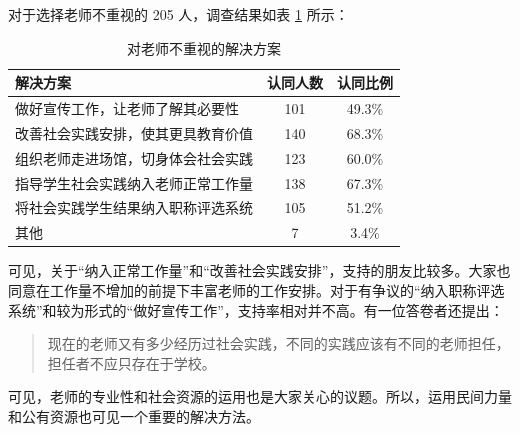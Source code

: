 \documentclass[12pt,UTF8]{ctexart}
\begin{document}
\par {
	对于选择老师不重视的 205 人，调查结果如表 \ref{fig:12} 所示：
	\begin{table}[htbp]
		\centering
		\caption{对老师不重视的解决方案}
		\label{fig:12}
		\begin{tabular}{lcc}
			\hline
			\hline
			{\bf 解决方案} & {\bf 认同人数} & {\bf 认同比例}\\ \hline
			做好宣传工作，让老师了解其必要性 & 101 & 49.3\% \\
			改善社会实践安排，使其更具教育价值 & 140 & 68.3\% \\
			组织老师走进场馆，切身体会社会实践 & 123 & 60.0\% \\
			指导学生社会实践纳入老师正常工作量 & 138 & 67.3\% \\
			将社会实践学生结果纳入职称评选系统 & 105 & 51.2\% \\
			其他 & 7 & 3.4\% \\
			\hline
			\hline
		\end{tabular}
	\end{table}
	
	可见，关于“纳入正常工作量”和“改善社会实践安排”，支持的朋友比较多。大家也同意在工作量不增加的前提下丰富老师的工作安排。对于有争议的“纳入职称评选系统”和较为形式的“做好宣传工作”，支持率相对并不高。有一位答卷者还提出：
	\begin{quote}
		\kaishu 现在的老师又有多少经历过社会实践，不同的实践应该有不同的老师担任，担任者不应只存在于学校。
	\end{quote}
	可见，老师的专业性和社会资源的运用也是大家关心的议题。所以，运用民间力量和公有资源也可见一个重要的解决方法。
}
\end{document}
